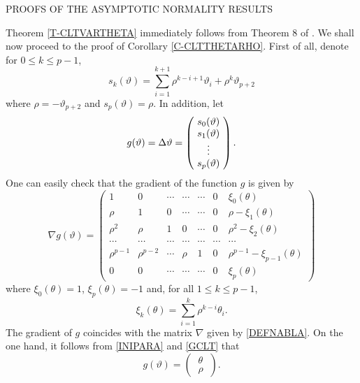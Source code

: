 \documentclass[article,12pt]{amsart}
\numberwithin{equation}{section}
\theoremstyle{plain}
\begin{document}
\begin{center}
{\small PROOFS OF THE ASYMPTOTIC NORMALITY RESULTS}
\end{center}

 
 \setcounter{section}{2}  
\setcounter{equation}{0}

Theorem \ref{T-CLTVARTHETA} immediately follows from Theorem 8 of \cite{BeVa2}. We shall now proceed to the proof
of Corollary \ref{C-CLTTHETARHO}. First of all, denote for $0\leq k \leq p-1$, 
$$
s_k(\vartheta)=\sum_{i=1}^{k+1} \rho^{k-i+1} \vartheta_i + \rho^{k} \vartheta_{p+2}
$$
where $\rho= -\vartheta_{p+2}$ and $s_p(\vartheta)= \rho$. In addition, let
\begin{equation}
\label{GCLT}
g(\vartheta) =
 \Delta \vartheta
 =
\begin{pmatrix}
\ s_{0}(\vartheta)  \ \\ 
\ s_{1}(\vartheta)  \ \\ 
\ \vdots  \ \\  
\ s_{p}(\vartheta)  \ 
\end{pmatrix}.
\vspace{1ex}
\end{equation}
One can easily check that the gradient of the function $g$ is given by
\begin{equation}
\label{GRAD}
\nabla g(\vartheta) =
\begin{pmatrix}
1 & 0 & \cdots & \cdots & \cdots & 0 & \xi_0(\theta) \\ 
\rho & 1 & 0 & \cdots & \cdots & 0 & \rho - \xi_1(\theta) \\ 
\rho^2 & \rho & 1 & 0 & \cdots & 0 & \rho^2 -  \xi_2(\theta) \\ 
\cdots & \cdots & \cdots & \cdots & \cdots & \cdots & \cdots \\ 
\rho^{p-1} & \rho^{p-2} & \cdots & \rho & 1 & 0 & \rho^{p-1} -\xi_{p-1}(\theta) \\ 
0 & 0 & \cdots & \cdots & \cdots & 0 & \xi_{p} (\theta)
\end{pmatrix}
\end{equation}
where $\xi_0(\theta)=1$, $\xi_p(\theta)=-1$ and, for all
$1\leq k \leq p-1$, 
$$
\xi_k(\theta) =\sum_{i=1}^{k}\rho^{k-i}\theta_i.
$$
The gradient of $g$ coincides with the matrix $\nabla$ given by \eqref{DEFNABLA}. On the one hand, it follows from
\eqref{INIPARA} and \eqref{GCLT} that
\begin{equation}
\label{DEFG}
g(\vartheta)=
\begin{pmatrix}
\ \theta \ \\
\ \rho \
\end{pmatrix}.
\end{equation}
\end{document}

